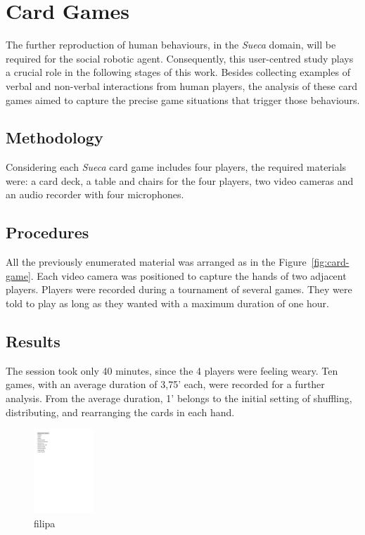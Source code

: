 \section{Card Games}
The further reproduction of human behaviours, in the \emph{Sueca} domain, will be required for the social robotic agent.
Consequently, this user-centred study plays a crucial role in the following stages of this work.
Besides collecting examples of verbal and non-verbal interactions from human players, the analysis of these card games aimed to capture the precise game situations that trigger those behaviours.



\subsection{Methodology}
Considering each \emph{Sueca} card game includes four players, the required materials were: a card deck, a table and chairs for the four players, two video cameras and an audio recorder with four microphones.

\subsection{Procedures}
All the previously enumerated material was arranged as in the Figure~\ref{fig:card-game}.
Each video camera was positioned to capture the hands of two adjacent players.
Players were recorded during a tournament of several games.
They were told to play as long as they wanted with a maximum duration of one hour.

\subsection{Results}
The session took only 40 minutes, since the 4 players were feeling weary.
Ten games, with an average duration of 3,75' each, were recorded for a further analysis.
From the average duration, 1' belongs to the initial setting of shuffling, distributing, and rearranging the cards in each hand.

\begin{figure}[h]
  \centering
    \includegraphics[width=0.2\textwidth]{./img/gameSituations}
  \caption{filipa}
\label{fig:gameSituations}
\end{figure}

